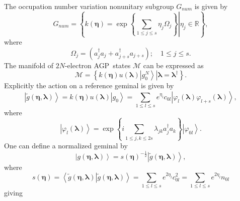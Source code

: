\documentclass[aps,preprint]{revtex4}%
\begin{document}
The occupation number variation nonunitary subgroup $G_{num}$ is given by
\begin{equation}
G_{num}=\left\{  \left.  k\left(  \mathbf{\eta}\right)  =\exp\left\{
\sum_{1\leq j\leq s}\eta_{j}\Omega_{j}\right\}  \right\vert \eta_{j}%
\in\mathbb{R}\right\}  , \label{occup}%
\end{equation}
where
\begin{equation}
\Omega_{j}=\left(  a_{j}^{\dagger}a_{j}+a_{j+s}^{\dagger}a_{j+s}\right)
;\quad1\leq j\leq s.
\end{equation}
The manifold of $2N$-electron AGP\ states $\mathcal{M}$ can be expressed as
\begin{equation}
\mathcal{M}\mathcal{=}\left\{  \left.  \overset{}{k\left(  \mathbf{\eta
}\right)  u\left(  \mathbf{\lambda}\right)  }\left\vert g_{0}^{N}\right\rangle
\right\vert \right.  \left.  \mathbf{\lambda}=\mathbf{\lambda}^{\dagger
}\right\}  .
\end{equation}
Explicitly the action on a reference geminal is given by
\begin{equation}
\left\vert \tilde{g}\left(  \mathbf{\eta},\mathbf{\lambda}\right)
\right\rangle =k\left(  \mathbf{\eta}\right)  u\left(  \mathbf{\lambda
}\right)  \left\vert g_{0}\right\rangle =\sum_{1\leq l\leq s}e^{\eta_{l}%
}c_{0l}\left\vert \varphi_{l}\left(  \mathbf{\lambda}\right)  \varphi
_{l+s}\left(  \mathbf{\lambda}\right)  \right\rangle ,
\end{equation}
where
\begin{equation}
\left\vert \varphi_{l}\left(  \mathbf{\lambda}\right)  \right\rangle
=\exp\left\{  i\sum_{1\leq j,k\leq2s}\lambda_{jk}a_{j}^{\dagger}a_{k}\right\}
\left\vert \varphi_{0l}\right\rangle .
\end{equation}
One can define a normalized geminal by
\begin{equation}
\left\vert g\left(  \mathbf{\eta},\mathbf{\lambda}\right)  \right\rangle
=\mathit{s}\left(  \mathbf{\eta}\right)  ^{-\frac{1}{2}}\left\vert \tilde
{g}\left(  \mathbf{\eta},\mathbf{\lambda}\right)  \right\rangle ,
\end{equation}
where
\begin{equation}
\mathit{s}\left(  \mathbf{\eta}\right)  =\left\langle \left.  \tilde{g}\left(
\mathbf{\eta},\mathbf{\lambda}\right)  \right\vert \tilde{g}\left(
\mathbf{\eta},\mathbf{\lambda}\right)  \right\rangle =\sum_{1\leq l\leq
s}e^{2\eta_{l}}c_{0l}^{2}=\sum_{1\leq l\leq s}e^{2\eta_{l}}n_{0l}%
\end{equation}
giving
\end{document}
